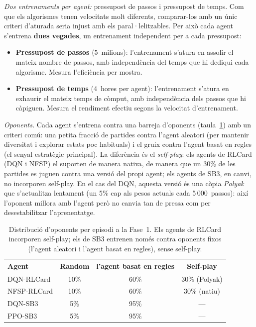 \emph{Dos entrenaments per agent:} pressupost de passos i pressupost de temps. Com que els
algorismes tenen velocitats molt diferents, comparar-los amb un únic criteri d'aturada seria
injust amb els paral·lelitzables. Per això cada agent s'entrena \textbf{dues vegades}, un
entrenament independent per a cada pressupost:
\begin{itemize}
  \item \textbf{Pressupost de passos} (5~milions): l'entrenament s'atura en assolir el
        mateix nombre de passos, amb independència del temps que hi dediqui cada algorisme.
        Mesura l'eficiència per mostra.
  \item \textbf{Pressupost de temps} (4~hores per agent): l'entrenament s'atura en exhaurir
        el mateix temps de còmput, amb independència dels passos que hi càpiguen. Mesura el
        rendiment efectiu segons la velocitat d'entrenament.
\end{itemize}

\emph{Oponents.} Cada agent s'entrena contra una barreja d'oponents
(taula~\ref{tab:fase1-oponents}) amb un criteri comú: una petita fracció de partides
contra l'agent aleatori (per mantenir diversitat i explorar estats poc habituals) i el
gruix contra l'agent basat en regles (el senyal estratègic principal). La diferència és el
\emph{self-play}: els agents de RLCard (DQN i NFSP) el suporten de manera nativa, de manera
que un 30\% de les partides es juguen contra una versió del propi agent; els agents de \ac{SB3}, en canvi, no incorporen self-play. En el cas del DQN,
aquesta versió és una còpia \emph{Polyak} que s'actualitza lentament (un 5\% cap als pesos
actuals cada 5\,000~passos): així l'oponent millora amb l'agent però no canvia tan de
pressa com per desestabilitzar l'aprenentatge.

\begin{table}[H]
  \centering
  \begin{tabular}{lccc}
    \toprule
    Agent & Random & l'agent basat en regles & Self-play \\
    \midrule
    DQN-RLCard  & 10\%      & 60\%       & 30\% (Polyak) \\
    NFSP-RLCard & 10\%      & 60\%       & 30\% (natiu) \\
    DQN-SB3     & 5\%       & 95\%       & — \\
    PPO-SB3     & 5\%       & 95\%       & — \\
    \bottomrule
  \end{tabular}
  \caption[Distribució d'oponents per episodi (Fase~1).]{Distribució d'oponents per episodi a la Fase~1. Els agents de RLCard
           incorporen self-play; els de \ac{SB3} entrenen només contra oponents fixos
           (l'agent aleatori i l'agent basat en regles), sense self-play.}
  \label{tab:fase1-oponents}
\end{table}


